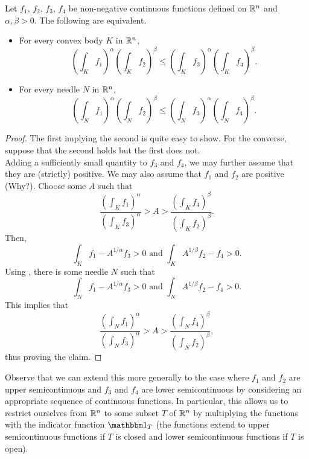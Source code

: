 \begin{lemma}
	\label{lem: 5.1}
	Let $f_1$, $f_2$, $f_3$, $f_4$ be non-negative continuous functions defined on $\mathbb{R}^n$ and $\alpha,\beta>0$. The following are equivalent.
	\begin{itemize}
		\item For every convex body $K$ in $\mathbb{R}^n$,
			\[ \left(\int_K f_1\right)^\alpha \left(\int_K f_2\right)^\beta \leq \left(\int_K f_3\right)^\alpha \left(\int_K f_4\right)^\beta. \]
		\item For every needle $N$ in $\mathbb{R}^n$,
			\[ \left(\int_N f_1\right)^\alpha \left(\int_N f_2\right)^\beta \leq \left(\int_N f_3\right)^\alpha \left(\int_N f_4\right)^\beta. \]
	\end{itemize}
\end{lemma}
\begin{proof}
	The first implying the second is quite easy to show. For the converse, suppose that the second holds but the first does not.\\
	Adding a sufficiently small quantity to $f_3$ and $f_4$, we may further assume that they are (strictly) positive. We may also assume that $f_1$ and $f_2$ are positive (Why?). Choose some $A$ such that
	\[ \frac{\left(\int_K f_1\right)^\alpha}{\left(\int_K f_3\right)^\alpha} > A > \frac{\left(\int_K f_4\right)^\beta}{\left(\int_K f_2\right)^\beta}. \]
	Then,
	\[ \int_K f_1 - A^{1/\alpha}f_3 > 0 \text{ and } \int_K A^{1/\beta}f_2 - f_4 > 0. \]
	Using , there is some needle $N$ such that
	\[ \int_N f_1 - A^{1/\alpha}f_3 > 0 \text{ and } \int_N A^{1/\beta}f_2 - f_4 > 0. \]
	This implies that
	\[ \frac{\left(\int_N f_1\right)^\alpha}{\left(\int_N f_3\right)^\alpha} > A > \frac{\left(\int_N f_4\right)^\beta}{\left(\int_N f_2\right)^\beta}, \]
	thus proving the claim.
\end{proof}

Observe that we can extend this more generally to the case where $f_1$ and $f_2$ are upper semicontinuous and $f_3$ and $f_4$ are lower semicontinuous by considering an appropriate sequence of continuous functions. In particular, this allows us to restrict ourselves from $\mathbb{R}^n$ to some subset $T$ of $\mathbb{R}^n$ by multiplying the functions with the indicator function $\indic_T$ (the functions extend to upper semicontinuous functions if $T$ is closed and lower semicontinuous functions if $T$ is open).

